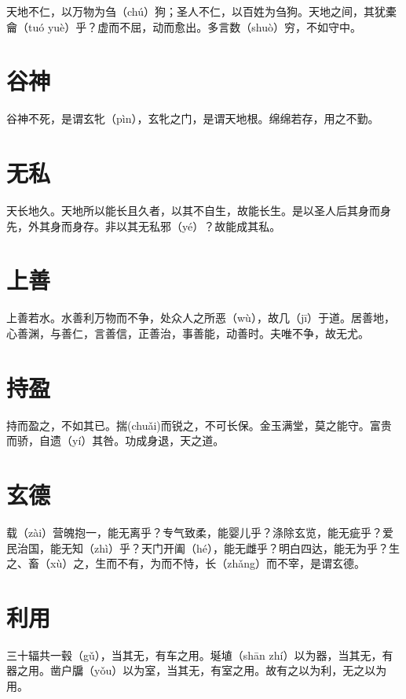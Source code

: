 \documentclass[a4paper,12pt,UTF8,twoside]{ctexbook}
\begin{document}
	天地不仁，以万物为刍（chú）狗；圣人不仁，以百姓为刍狗。天地之间，其犹橐龠（tuó	yuè）乎？虚而不屈，动而愈出。多言数（shuò）穷，不如守中。
	
	
	
	
	\chapter{谷神}
	谷神不死，是谓玄牝（pìn），玄牝之门，是谓天地根。绵绵若存，用之不勤。
	
	
	
	
	
	\chapter{无私}
	天长地久。天地所以能长且久者，以其不自生，故能长生。是以圣人后其身而身先，外其身而身存。非以其无私邪（yé）？故能成其私。
	
	
	
	
	\chapter{上善}
	上善若水。水善利万物而不争，处众人之所恶（wù），故几（jī）于道。居善地，心善渊，与善仁，言善信，正善治，事善能，动善时。夫唯不争，故无尤。
	
	
	\chapter{持盈}
	
	持而盈之，不如其已。揣(chuǎi)而锐之，不可长保。金玉满堂，莫之能守。富贵而骄，自遗（yí）其咎。功成身退，天之道。	

	\chapter{玄德}
		
	载（zài）营魄抱一，能无离乎？专气致柔，能婴儿乎？涤除玄览，能无疵乎？爱民治国，能无知（zhì）乎？天门开阖（hé），能无雌乎？明白四达，能无为乎？生之、畜（xù）之，生而不有，为而不恃，长（zhǎng）而不宰，是谓玄德。
	
	\chapter{利用}
	
	三十辐共一毂（gǔ），当其无，有车之用。埏埴（shān zhí）以为器，当其无，有器之用。凿户牖（yǒu）以为室，当其无，有室之用。故有之以为利，无之以为用。
	
\end{document}
